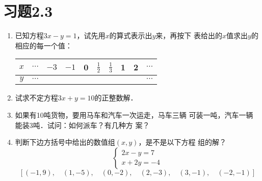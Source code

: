 \section*{习题2.3}
\begin{enumerate}
 \item 已知方程$3x-y=1$，试先用$x$的算式表示出$y$来，再按下
表给出的$x$值求出$y$的相应的每一个值：
\begin{center}
    \begin{tabular}{c|ccccccccc}
   $x$ & $\cdots$ &$-3$&$-1$&0&$\frac{1}{2}$&$\frac{1}{3}$&1&2& $\cdots$\\
   \hline
   $y$ & $\cdots$ &&&&&&&&    $\cdots$\\
    \end{tabular}
\end{center}
    \item 试求不定方程$3x+y=10$的正整数解．
    \item 如果有10吨货物，要用马车和汽车一次运走，马车三辆
可装一吨，汽车一辆能装3吨．试问：如何派车？有几种方
案？
\item 判断下边方括号中给出的数值组$(x, y)$，是不是以下方程
组的解？
 \[\begin{cases}
    2x-y=7\\x+2y=-4
 \end{cases}\]   
\[[(-1,9),\quad  (1,-5),\quad  (0,-2),\quad  (2,-3),\quad  (3,-1),\quad  (-2,-1)] \]


\end{enumerate}
